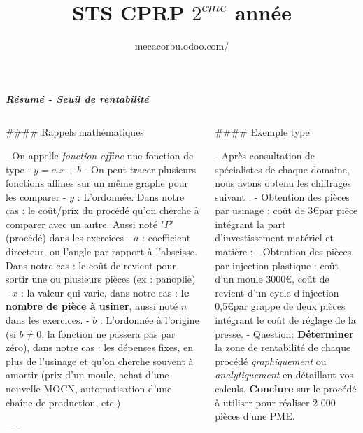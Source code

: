 \documentclass{beamer}
\author[Chevalier.V]{mecacorbu.odoo.com/}
\title{STS CPRP $2^{eme}$ année}
\institute{Lycée Le Corbusier}
\begin{document}
\begin{frame}[fragile]\centering

\textbf{\textit{Résumé - Seuil de rentabilité}}

\begin{columns}
\begin{column}{0.57\textwidth}

\begin{markdown}

#### Rappels mathématiques

- On appelle \textit{fonction affine} une fonction de type : $y=a.x+b$
- On peut tracer plusieurs fonctions affines sur un même graphe pour les comparer
- $y$ : L'ordonnée. Dans notre cas : le coût/prix du procédé qu'on cherche à comparer avec un autre. Aussi noté "$P$" (procédé) dans les exercices
- $a$ : coefficient directeur, ou l'angle par rapport à l'abscisse. Dans notre cas : le coût de revient pour sortir une ou plusieurs pièces (ex : panoplie)
- $x$ : la valeur qui varie, dans notre cas : \textbf{le nombre de pièce à usiner}, aussi noté $n$ dans les exercices.
- $b$ : L'ordonnée à l'origine (si $b \neq 0$, la fonction ne passera pas par zéro), dans notre cas : les dépenses fixes, en plus de l'usinage et qu'on cherche souvent à amortir (prix d'un moule, achat d'une nouvelle MOCN, automatisation d'une chaîne de production, etc.)



----
\end{markdown}

\end{column}




\begin{column}{.4\textwidth}
\begin{markdown}




#### Exemple type

- Après consultation de spécialistes de chaque domaine, nous avons obtenu les chiffrages suivant :
- Obtention des pièces par usinage : coût de 3\euro par pièce intégrant la part d’investissement matériel et matière ;
- Obtention des pièces par injection plastique : coût d'un moule 3000\euro, coût de revient d’un cycle d’injection 0,5\euro par grappe de deux pièces intégrant le coût de réglage de la presse.
- Question: \textbf{Déterminer} la zone de rentabilité de chaque procédé \textit{graphiquement} ou \textit{analytiquement} en détaillant vos calculs.
\textbf{Conclure} sur le procédé à utiliser pour réaliser 2 000 pièces d'une PME.


\end{markdown}
\end{column}
\end{columns}
\end{frame}
\end{document}

